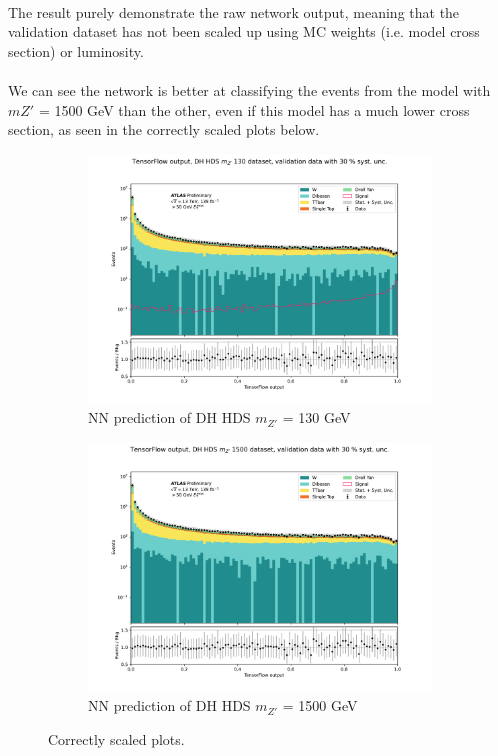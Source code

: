 \documentclass[14pt, a4paper]{book}
\begin{document}
\\The result purely demonstrate the raw network output, meaning that the validation dataset has not been scaled up using MC weights (i.e. model cross section) or luminosity.\\
\\We can see the network is better at classifying the events from the model with $m{Z'}$ = 1500 GeV than the other, even if this model has a much lower cross section, as seen in the correctly scaled plots below.
\begin{figure}[!ht]
	\centering
	\begin{subfigure}[b]{0.49\textwidth}
        \centering
        \includegraphics[width=1\textwidth]{DH_HDS_mZp_130/VAL.pdf}
        \caption{NN prediction of DH HDS $m_{Z'}$ = 130 GeV}
     \end{subfigure}
     \hfill
     \begin{subfigure}[b]{0.49\textwidth}
        \centering
        \includegraphics[width=1\textwidth]{DH_HDS_mZp_1500/VAL.pdf}
        \caption{NN prediction of DH HDS $m_{Z'}$ = 1500 GeV}
     \end{subfigure}
     \caption{Correctly scaled plots.}\label{fig:SCALED_PurelyBalanced_DH_HDS}
\end{figure}
\end{document}
